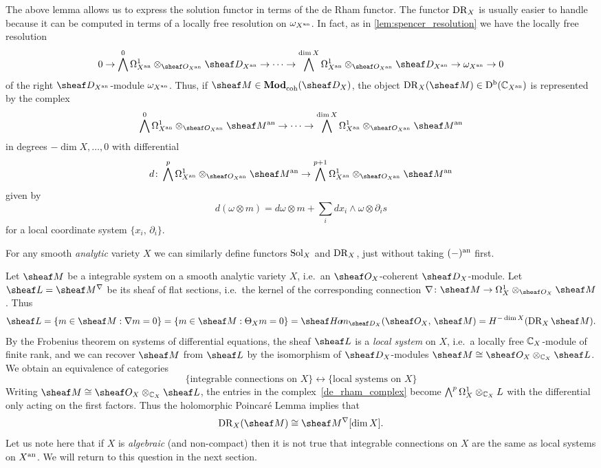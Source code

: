 \documentclass[number-in-sections,a4paper]{notes}
\begin{document}
The above lemma allows us to express the solution functor in terms of the de Rham functor.
The functor $\operatorname{DR}_X$ is usually easier to handle because it can be computed in terms of a locally free resolution on $\omega_{X^{\mathrm{an}}}$.
In fact, as in \ref{lem:spencer_resolution} we have the locally free resolution
\[
    0 \to
    \bigwedge^0 \ctb {X^\an} \otimes_{\sO_{X^\an}} \sD_{X^\an} \to
    \dots \to
    \bigwedge^{\dim X} \ctb {X^\an} \otimes_{\sO_{X^\an}} \sD_{X^\an} \to
    \canon_{X^\an} \to 0
\]
of the right $\sD_{X^\an}$-module $\omega_{X^{\mathrm{an}}}$.
Thus, if $\sheaf M \in \catDModcoh{X}$, the object $\DR_X(\sheaf M) \in \catDbCMod{X^\an}$ is represented by the complex
\begin{equation}\label{de_rham_complex}
    \bigwedge^0 \ctb {X^\an} \otimes_{\sO_{X^\an}} \sheaf M^\an \to
    \dots \to
    \bigwedge^{\dim X} \ctb {X^\an} \otimes_{\sO_{X^\an}} \sheaf M^\an
\end{equation}
in degrees $-\dim X, \dots, 0$ with differential
\[
    d\colon \bigwedge^p \ctb {X^\an} \otimes_{\sO_{X^\an}} \sheaf M^\an \to \bigwedge^{p+1} \ctb {X^\an} \otimes_{\sO_{X^\an}} \sheaf M^\an
\]
given by
\[
    d(\omega \otimes m) = d\omega \otimes m + \sum_i dx_i \wedge \omega \otimes \partial_i s
\]
for a local coordinate system $\{x_i,\, \partial_i\}$.

\begin{Example}
    For any smooth \emph{analytic} variety $X$ we can similarly define functors $\operatorname{Sol}_X$ and $\operatorname{DR}_X$, just without taking $(-)^{\mathrm{an}}$ first.

    Let $\sheaf M$ be a integrable system on a smooth analytic variety $X$, i.e.~an $\sO_{X}$-coherent $\sD_{X}$-module.
    Let $\sheaf L = \sheaf M^\nabla$ be its sheaf of flat sections, i.e.~the kernel of the corresponding connection $\nabla\colon \sheaf M \to \ctb X \otimes_{\sO_X} \sheaf M$.
    Thus
    \[
        \sheaf L = \{ m \in \sheaf M : \nabla m = 0\} =
        \{ m \in \sheaf M : \tb Xm = 0 \} =
        \sheafHom_{\sD_X}(\sO_X,\, \sheaf M) =
        H^{-\dim X}(\DR_X\sheaf M).
    \]
    By the Frobenius theorem on systems of differential equations, the sheaf $\sheaf L$ is a \emph{local system} on $X$, i.e.~a locally free ${\mathbb{C}}_X$-module of finite rank, and we can recover $\sheaf M$ from $\sheaf L$ by the isomorphism of $\sD_X$-modules $\sheaf M \cong \sO_X \otimes_{\CC_X} \sheaf L$.
    We obtain an equivalence of categories
    \[
        \bigl\{\text{integrable connections on $X$}\bigr \}
        \leftrightarrow
        \bigl\{\text{local systems on $X$}\bigr \}
    \]
    Writing $\sheaf M \cong \sO_X \otimes_{\CC_X} \sheaf L$, the entries in the complex~\eqref{de_rham_complex} become $\bigwedge^p \Omega^1_{X} \otimes_{{\mathbb{C}}_X} L$ with the differential only acting on the first factors.
    Thus the holomorphic Poincar\'e Lemma implies that
    \[
        \DR_X(\sheaf M) \cong \sheaf M^\nabla[\dim X].
    \]
    Let us note here that if $X$ is \emph{algebraic} (and non-compact) then it is not true that integrable connections on $X$ are the same as local systems on $X^{\mathrm{an}}$.
    We will return to this question in the next section.
\end{Example}
\end{document}
